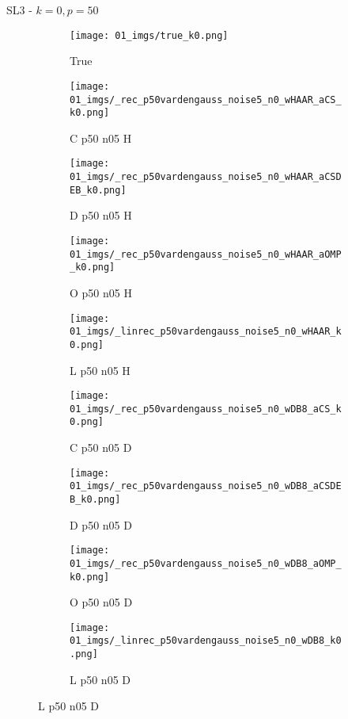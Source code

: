 \begin{frame}{SL3 - $k=0,p=50$}{}
\begin{figure}
\begin{subfigure}{0.1\textwidth}
\texttt{[image: 01\_imgs/true\_k0.png]}
\caption*{\Tiny True}
\end{subfigure}
\begin{subfigure}{0.1\textwidth}
\texttt{[image: 01\_imgs/\_rec\_p50vardengauss\_noise5\_n0\_wHAAR\_aCS\_k0.png]}
\caption*{\Tiny C p50 n05 H}
\end{subfigure}
\begin{subfigure}{0.1\textwidth}
\texttt{[image: 01\_imgs/\_rec\_p50vardengauss\_noise5\_n0\_wHAAR\_aCSDEB\_k0.png]}
\caption*{\Tiny D p50 n05 H}
\end{subfigure}
\begin{subfigure}{0.1\textwidth}
\texttt{[image: 01\_imgs/\_rec\_p50vardengauss\_noise5\_n0\_wHAAR\_aOMP\_k0.png]}
\caption*{\Tiny O p50 n05 H}
\end{subfigure}
\begin{subfigure}{0.1\textwidth}
\texttt{[image: 01\_imgs/\_linrec\_p50vardengauss\_noise5\_n0\_wHAAR\_k0.png]}
\caption*{\Tiny L p50 n05 H}
\end{subfigure}
\begin{subfigure}{0.1\textwidth}
\texttt{[image: 01\_imgs/\_rec\_p50vardengauss\_noise5\_n0\_wDB8\_aCS\_k0.png]}
\caption*{\Tiny C p50 n05 D}
\end{subfigure}
\begin{subfigure}{0.1\textwidth}
\texttt{[image: 01\_imgs/\_rec\_p50vardengauss\_noise5\_n0\_wDB8\_aCSDEB\_k0.png]}
\caption*{\Tiny D p50 n05 D}
\end{subfigure}
\begin{subfigure}{0.1\textwidth}
\texttt{[image: 01\_imgs/\_rec\_p50vardengauss\_noise5\_n0\_wDB8\_aOMP\_k0.png]}
\caption*{\Tiny O p50 n05 D}
\end{subfigure}
\begin{subfigure}{0.1\textwidth}
\texttt{[image: 01\_imgs/\_linrec\_p50vardengauss\_noise5\_n0\_wDB8\_k0.png]}
\caption*{\Tiny L p50 n05 D}
\end{subfigure}

\vspace{5pt}


\end{figure}
\end{frame}
